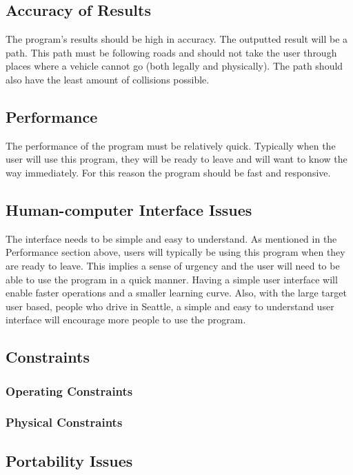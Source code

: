 \documentclass[12pt]{article}
\begin{document}
\subsection{Accuracy of Results}
The program's results should be high in accuracy. The outputted result will be a path. This path must be following roads and should not take the user through places where a vehicle cannot go (both legally and physically). The path should also have the least amount of collisions possible.

\subsection{Performance}
The performance of the program must be relatively quick. Typically when the user will use this program, they will be ready to leave and will want to know the way immediately. For this reason the program should be fast and responsive.

\subsection{Human-computer Interface Issues}
The interface needs to be simple and easy to understand. As mentioned in the Performance section above, users will typically be using this program when they are ready to leave. This implies a sense of urgency and the user will need to be able to use the program in a quick manner. Having a simple user interface will enable faster operations and a smaller learning curve. Also, with the large target user based, people who drive in Seattle, a simple and easy to understand user interface will encourage more people to use the program.

\subsection{Constraints}
    \subsubsection{Operating Constraints}
    
    
    \subsubsection{Physical Constraints}
    
\subsection{Portability Issues}
\end{document}
